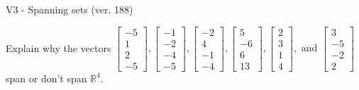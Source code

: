 \begin{exercise}
  \begin{exerciseTitle}V3 - Spanning sets (ver. 188)\end{exerciseTitle}
  \begin{exerciseStatement}
    Explain why the vectors \(\left[\begin{array}{r}
-5 \\
1 \\
2 \\
-5
\end{array}\right] , \left[\begin{array}{r}
-1 \\
-2 \\
-4 \\
-5
\end{array}\right] , \left[\begin{array}{r}
-2 \\
4 \\
-1 \\
-4
\end{array}\right] , \left[\begin{array}{r}
5 \\
-6 \\
6 \\
13
\end{array}\right] , \left[\begin{array}{r}
2 \\
3 \\
1 \\
4
\end{array}\right] , \text{ and } \left[\begin{array}{r}
3 \\
-5 \\
-2 \\
2
\end{array}\right]\) span or don't span \(\mathbb{R}^4\). 
	



\end{exerciseStatement}
\end{exercise}

